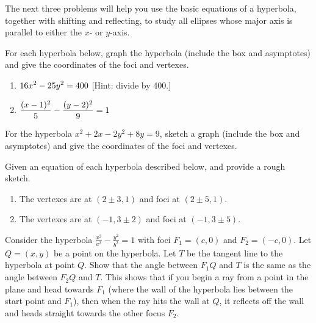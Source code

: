 The next three problems will help you use the basic equations of a hyperbola, together with shifting and reflecting, to study all ellipses whose major axis is parallel to either the $x$- or $y$-axis. 

\begin{problem} 
%
For each hyperbola below, graph the hyperbola (include the box and asymptotes) and give the coordinates of the foci and vertexes. 
\begin{enumerate}
\item $\displaystyle 16x^2-25y^2=400$ [Hint: divide by 400.]
\item $\displaystyle \frac{(x-1)^2}{5}-\frac{(y-2)^2}{9}=1$
\end{enumerate}
\end{problem}

\begin{problem}
For the hyperbola $x^2+2x-2y^2+8y=9$, sketch a graph (include the box and asymptotes) and give the coordinates of the foci and vertexes. 
\end{problem}

\begin{problem} 
%
Given an equation of each hyperbola described below, and provide a rough sketch.
\begin{enumerate}
\item The vertexes are at $(2\pm 3,1)$ and foci at $(2\pm 5, 1)$.
\item The vertexes are at $(-1,3\pm 2)$ and foci at $(-1, 3\pm 5)$.
\end{enumerate}
\end{problem}


\begin{problem*}[Optional]
Consider the hyperbola $\frac{x^2}{a^2}-\frac{y^2}{b^2}=1$ with foci $F_1=(c,0)$ and $F_2=(-c,0)$. 
Let $Q=(x,y)$ be a point on the hyperbola. 
Let $T$ be the tangent line to the hyperbola at point $Q$. 
Show that the angle between $F_1Q$ and $T$ is the same as the angle between $F_2Q$ and $T$. This shows that if you begin a ray from a point in the plane and head towards $F_1$ (where the wall of the hyperbola lies between the start point and $F_1$), then when the ray hits the wall at $Q$, it reflects off the wall and heads straight towards the other focus $F_2$.
\end{problem*}

